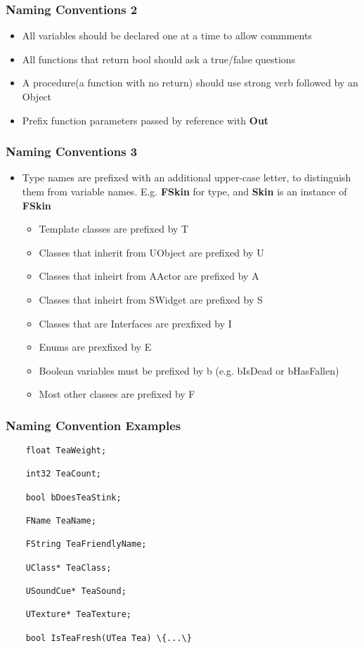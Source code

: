 \begin{frame}
  \frametitle{Naming Conventions 2}
  \begin{itemize}
    \item All variables should be declared one at a time to allow commments
    \item All functions that return bool should ask a true/false questions
    \item A procedure(a function with no return) should use strong verb followed by an Object
    \item Prefix function parameters passed by reference with \textbf{Out}
  \end{itemize}
\end{frame}

\begin{frame}
  \frametitle{Naming Conventions 3}
  \begin{itemize}
    \item Type names are prefixed with an additional upper-case letter, to distinguish them from variable names.
    E.g. \textbf{FSkin} for type, and \textbf{Skin} is an instance of \textbf{FSkin}
    \begin{itemize}
      \item Template classes are prefixed by T
      \item Classes that inherit from UObject are prefixed by U
      \item Classes that inheirt from AActor are prefixed by A
      \item Classes that inheirt from SWidget are prefixed by S
      \item Classes that are Interfaces are prexfixed by I
      \item Enums are prexfixed by E
      \item Boolean variables must be prefixed by b (e.g. bIsDead or bHasFallen)
      \item Most other classes are prefixed by F
    \end{itemize}
  \end{itemize}
\end{frame}

\begin{frame}[fragile]
  \frametitle{Naming Convention Examples}
  \begin{lstlisting}
    float TeaWeight;

    int32 TeaCount;

    bool bDoesTeaStink;

    FName TeaName;

    FString TeaFriendlyName;

    UClass* TeaClass;

    USoundCue* TeaSound;

    UTexture* TeaTexture;

    bool IsTeaFresh(UTea Tea) \{...\}
  \end{lstlisting}
\end{frame}

